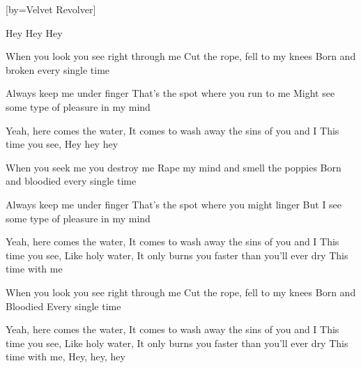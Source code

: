 

[by=Velvet Revolver]


\beginverse
Hey Hey Hey

When you look you see right through me
Cut the rope, fell to my knees
Born and broken every single time

Always keep me under finger
That's the spot where you run to me
Might see some type of pleasure in my mind
\endverse

\beginverse
Yeah, here comes the water, It comes to wash away the sins of you and I
This time you see, Hey hey hey
\endverse

\beginverse
When you seek me you destroy me
Rape my mind and smell the poppies
Born and bloodied every single time

Always keep me under finger
That's the spot where you might linger
But I see some type of pleasure in my mind
\endverse

\beginverse
Yeah, here comes the water, It comes to wash away the sins of you and I
This time you see, Like holy water, It only burns you faster than you'll ever dry
This time with me
\endverse

\endverse

\beginverse
When you look you see right through me
Cut the rope, fell to my knees
Born and Bloodied
Every single time
\endverse

\beginverse
Yeah, here comes the water, It comes to wash away the sins of you and I
This time you see, Like holy water, It only burns you faster than you'll ever dry
This time with me, Hey, hey, hey
\endverse



\chordson
\endsong
